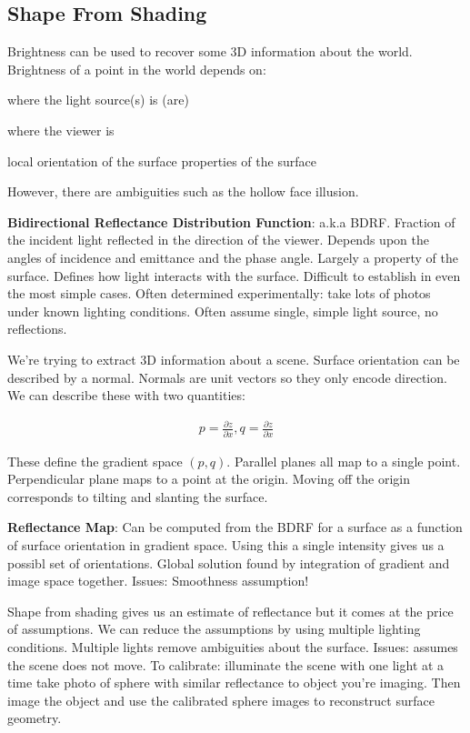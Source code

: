 \documentclass[8pt]{extarticle}
\begin{document}
\begin{multicols}{2}
\subsection{Shape From Shading}
Brightness can be used to recover some 3D information about the world. Brightness of a point in the world depends on:
\begin{compactitem}
    \item where the light source(s) is (are)
    \item where the viewer is
    \item local orientation of the surface properties of the surface
\end{compactitem}
However, there are ambiguities such as the hollow face illusion.

\textbf{Bidirectional Reflectance Distribution Function}: a.k.a BDRF. Fraction of the incident light reflected in the direction of the viewer. Depends upon the angles of incidence and emittance and the phase angle. Largely a property of the surface. Defines how light interacts with the surface. Difficult to establish in even the most simple cases. Often determined experimentally: take lots of photos under known lighting conditions. Often assume single, simple light source, no reflections.

We're trying to extract 3D information about a scene. Surface orientation can be described by a normal. Normals are unit vectors so they only encode direction. We can describe these with two quantities:

\begin{gather}
    p = \frac{\partial z}{\partial x}, q = \frac{\partial z}{\partial x}
\end{gather}

These define the gradient space $(p,q)$. Parallel planes all map to a single point. Perpendicular plane maps to a point at the origin. Moving off the origin corresponds to tilting and slanting the surface.

\textbf{Reflectance Map}: Can be computed from the BDRF for a surface as a function of surface orientation in gradient space. Using this a single intensity gives us a possibl set of orientations. Global solution found by integration of gradient and image space together. Issues: Smoothness assumption!

Shape from shading gives us an estimate of reflectance but it comes at the price of assumptions. We can reduce the assumptions by using multiple lighting conditions. Multiple lights remove ambiguities about the surface. Issues: assumes the scene does not move. To calibrate: illuminate the scene with one light at a time take photo of sphere with similar reflectance to object you're imaging. Then image the object and use the calibrated sphere images to reconstruct surface geometry.


\end{multicols}
\end{document}
